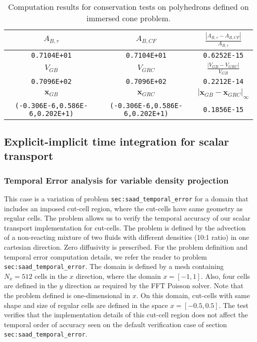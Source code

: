 \documentclass[12pt]{article}
\begin{document}
%
\begin{table}[h]
  \begin{tabular}{c|c|c}
    \hline \hline
      $A_{B,\tau}$ & $A_{B,CF}$ & $\frac{|A_{B,\tau}-A_{B,CF} |}{A_{B,\tau}}$ \\ \hline
       \texttt{0.7104E+01} & \texttt{0.7104E+01} & \texttt{0.6252E-15} \\
    \hline \hline
      $V_{GB}$ & $V_{GRC}$ & $\frac{|V_{GB}-V_{GRC}|}{V_{GB}}$ \\  \hline
      \texttt{0.7096E+02} & \texttt{0.7096E+02} & \texttt{0.2212E-14} \\
    \hline \hline
    $\mathbf{x}_{GB}$ & $\mathbf{x}_{GRC}$ & $|\mathbf{x}_{GB}-\mathbf{x}_{GRC}|_\infty$ \\
    \hline \hline
    \texttt{(-0.306E-6,0.586E-6,0.202E+1)} &
    \texttt{(-0.306E-6,0.586E-6,0.202E+1)} &
    \texttt{0.1856E-15} \\
    \hline
  \end{tabular}
  \caption{Computation results for conservation tests on polyhedrons defined on immersed cone problem.} 
  \label{tab:cone_res}
\end{table}
%




\subsection{Explicit-implicit time integration for scalar transport}


\subsubsection{Temporal Error analysis for variable density projection}

\label{sec:saad_cc_temporal_error}

This case is a variation of problem \texttt{sec:saad\_temporal\_error} for a domain that includes an imposed cut-cell region, where the cut-cells have same geometry as regular cells. The problem allows us to verify the temporal accuracy of our scalar transport implementation for cut-cells. The problem is defined by the advection of a non-reacting mixture of two fluids with different densities (10:1 ratio) in one cartesian direction. Zero diffusivity is prescribed. For the problem definition and temporal error computation details, we refer the reader to problem \texttt{sec:saad\_temporal\_error}.
The domain is defined by a mesh containing $N_x=512$ cells in the $x$ direction, where the domain $x=[-1,1]$. Also, four cells are defined in the $y$ direction as required by the FFT Poisson solver. Note that the problem defined is one-dimensional in $x$.
On this domain, cut-cells with same shape and size of regular cells are defined in the space $x=[-0.5,0.5]$. The test verifies that the implementation details of this cut-cell region does not affect the temporal order of accuracy seen on the default verification case of section \texttt{sec:saad\_temporal\_error}.
\end{document}
